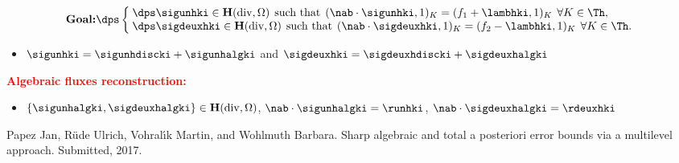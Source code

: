 \documentclass{beamer}
\renewcommand{\div}{\mathrm{div}}
\begin{document}
\begin{frame}
\vspace{-0.3 cm}
\normalsize
\begin{equation*}
\mbox{\textbf{Goal:}}\dps
\left\lbrace\begin{array}{llccc}
\hspace{-0.1 cm}\dps \sigunhki \in \textbf H(\div,\Omega) \hspace{0.15 cm} \mbox{such that} \hspace{0.15 cm} (\nab \cdot \sigunhki,1)_K=(f_1+\lambhki,1)_K \hspace{0.15 cm} \forall K \in \Th, \\
\hspace{-0.1 cm}\dps\sigdeuxhki \in \textbf H(\div,\Omega) \hspace{0.15 cm} \mbox{such that} \hspace{0.15 cm} (\nab \cdot \sigdeuxhki,1)_K=(f_2-\lambhki,1)_K \hspace{0.15 cm} \forall K \in \Th .
\end{array}
\right.
\end{equation*}
\normalsize
\begin{itemize}
\item 
$\sigunhki = \sigunhdiscki + \sigunhalgki$ and $\sigdeuxhki = \sigdeuxhdiscki + \sigdeuxhalgki$
\end{itemize}
\vspace{0.3 cm}
\textcolor{red}{\textbf{Algebraic fluxes reconstruction:}}
\begin{itemize}
\item $\left\{\sigunhalgki,\sigdeuxhalgki\right\} \in \textbf H(\div,\Omega)$, \: $\nab \cdot \sigunhalgki=\runhki$, \: $\nab \cdot \sigdeuxhalgki=\rdeuxhki$
\end{itemize}
\scriptsize
\begin{thebibliography}{10}
Papez Jan, Rüde Ulrich, Vohral{\'{\i}}k Martin, and Wohlmuth Barbara.
\newblock Sharp algebraic and total a posteriori error bounds via a multilevel
approach.
\newblock Submitted, 2017.
\end{thebibliography}
\end{frame}
\end{document}
